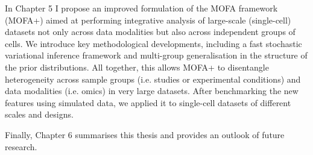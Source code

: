 In Chapter 5 I propose an improved formulation of the MOFA framework (MOFA+) aimed at performing integrative analysis of large-scale (single-cell) datasets not only across data modalities but also across independent groups of cells. We introduce key methodological developments, including a fast stochastic variational inference framework and multi-group generalisation in the structure of the prior distributions. All together, this allows MOFA+ to  disentangle heterogeneity across sample groups (i.e. studies or experimental conditions) and data modalities (i.e. omics) in very large datasets. After benchmarking the new features using simulated data, we applied it to single-cell datasets of different scales and designs.

Finally, Chapter 6 summarises this thesis and provides an outlook of future research.
